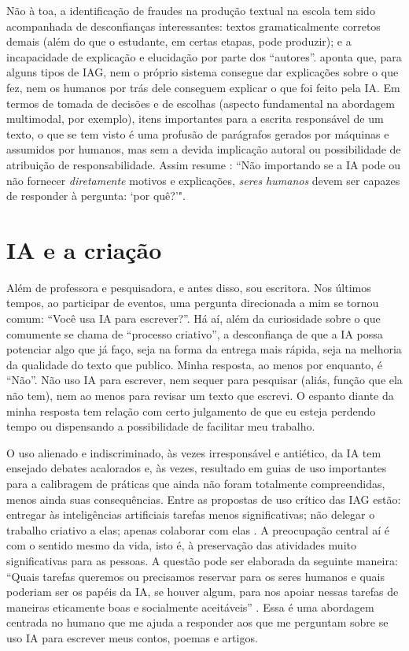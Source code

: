 \documentclass[portuguese]{textolivre}
\begin{document}
Não à toa, a identificação de fraudes na produção textual na escola tem sido acompanhada de desconfianças interessantes: textos gramaticalmente corretos demais (além do que o estudante, em certas etapas, pode produzir); e a incapacidade de explicação e elucidação por parte dos ``autores''. \textcite{coeckelbergh2023} aponta que, para alguns tipos de IAG, nem o próprio sistema consegue dar explicações sobre o que fez, nem os humanos por trás dele conseguem explicar o que foi feito pela IA. Em termos de tomada de decisões e de escolhas (aspecto fundamental na abordagem multimodal, por exemplo), itens importantes para a escrita responsável de um texto, o que se tem visto é uma profusão de parágrafos gerados por máquinas e assumidos por humanos, mas sem a devida implicação autoral ou possibilidade de atribuição de responsabilidade. Assim resume \textcite[p. 116, grifos do original]{coeckelbergh2023}: ``Não importando se a IA pode ou não fornecer \textit{diretamente} motivos e explicações, \textit{seres humanos} devem ser capazes de responder à pergunta: `por quê?'".

\section{IA e a criação}
Além de professora e pesquisadora, e antes disso, sou escritora. Nos últimos tempos, ao participar de eventos, uma pergunta direcionada a mim se tornou comum: ``Você usa IA para escrever?''. Há aí, além da curiosidade sobre o que comumente se chama de ``processo criativo'', a desconfiança de que a IA possa potenciar algo que já faço, seja na forma da entrega mais rápida, seja na melhoria da qualidade do texto que publico. Minha resposta, ao menos por enquanto, é ``Não''. Não uso IA para escrever, nem sequer para pesquisar (aliás, função que ela não tem), nem ao menos para revisar um texto que escrevi. O espanto diante da minha resposta tem relação com certo julgamento de que eu esteja perdendo tempo ou dispensando a possibilidade de facilitar meu trabalho.

O uso alienado e indiscriminado, às vezes irresponsável e antiético, da IA tem ensejado debates acalorados e, às vezes, resultado em guias de uso importantes para a calibragem de práticas que ainda não foram totalmente compreendidas, menos ainda suas consequências. Entre as propostas de uso crítico das IAG estão: entregar às inteligências artificiais tarefas menos significativas; não delegar o trabalho criativo a elas; apenas colaborar com elas \cite{coeckelbergh2023}. A preocupação central aí é com o sentido mesmo da vida, isto é, à preservação das atividades muito significativas para as pessoas. A questão pode ser elaborada da seguinte maneira: ``Quais tarefas queremos ou precisamos reservar para os seres humanos e quais poderiam ser os papéis da IA, se houver algum, para nos apoiar nessas tarefas de maneiras eticamente boas e socialmente aceitáveis'' \cite[p. 131]{coeckelbergh2023}. Essa é uma abordagem centrada no humano que me ajuda a responder aos que me perguntam sobre se uso IA para escrever meus contos, poemas e artigos.
\end{document}
